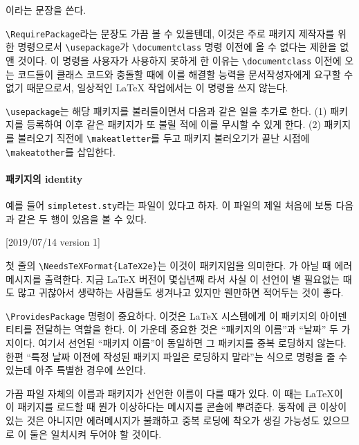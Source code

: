 \documentclass[a4paper,amsmath]{oblivoir}
\begin{document}
\begin{exampleonly}
\usepackage[<options>]{<name>}
\end{exampleonly}

이라는 문장을 쓴다.

\verb|\RequirePackage|라는 문장도 가끔 볼 수 있을텐데, 이것은 주로 패키지 제작자를 위한 명령으로서
\verb|\usepackage|가 \verb|\documentclass| 명령 이전에 올 수 없다는 제한을 없앤 것이다.
이 명령을 사용자가 사용하지 못하게 한 이유는 \verb|\documentclass| 이전에 오는 코드들이
클래스 코드와 충돌할 때에 이를 해결할 능력을 문서작성자에게 요구할 수 없기 때문으로서, 일상적인
\LaTeX{} 작업에서는 이 명령을 쓰지 않는다.

\verb|\usepackage|는 해당 패키지를 불러들이면서 다음과 같은 일을 추가로 한다.
(1) 패키지를 등록하여 이후 같은 패키지가 또 불릴 적에 이를 무시할 수 있게 한다.
(2) 패키지를 불러오기 직전에 \verb|\makeatletter|를 두고 패키지 불러오기가 끝난 시점에 \verb|\makeatother|를 삽입한다.

\paragraph{패키지의 identity}

예를 들어 \verb|simpletest.sty|라는 파일이 있다고 하자. 이 파일의 제일 처음에 보통 다음과 같은
두 행이 있음을 볼 수 있다.

\begin{exampleonly}
[2019/07/14 version 1]
\end{exampleonly}

첫 줄의 \verb|\NeedsTeXFormat{LaTeX2e}|는 이것이 \LaTeXe{} 패키지임을 의미한다.
\LaTeXe 가 아닐 때 에러 메시지를 출력한다. 지금 \LaTeX{} 버전이 몇십년째 \LaTeXe 라서
사실 이 선언이 별 필요없는 때도 많고 귀찮아서 생략하는 사람들도 생겨나고 있지만
웬만하면 적어두는 것이 좋다.

\verb|\ProvidesPackage| 명령이 중요하다.
이것은 \LaTeX{} 시스템에게 이 패키지의 아이덴티티를 전달하는
역할을 한다. 이 가운데 중요한 것은 “패키지의 이름”과 “날짜” 두 가지이다. 
여기서 선언된 “패키지 이름”이 동일하면 그 패키지를 중복 로딩하지 않는다.
한편 “특정 날짜 이전에 작성된 패키지 파일은 로딩하지 말라”는 식으로 명령을 줄 수 있는데
아주 특별한 경우에 쓰인다.

가끔 파일 자체의 이름과 패키지가 선언한 이름이 다를 때가 있다. 이 때는 \LaTeX 이 이 패키지를 로드할 때
뭔가 이상하다는 메시지를 콘솔에 뿌려준다. 동작에 큰 이상이 있는 것은 아니지만 에러메시지가
불쾌하고 중복 로딩에 착오가 생길 가능성도 있으므로 이 둘은 일치시켜 두어야 할 것이다.
\end{document}
